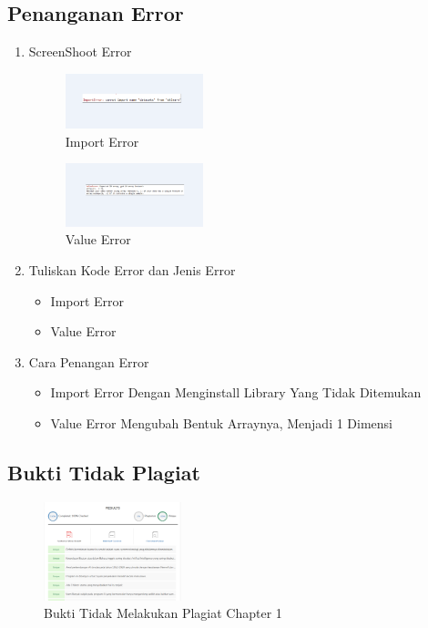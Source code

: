 \subsection{Penanganan Error}
\begin{enumerate}
	\item ScreenShoot Error
	\begin{figure}[H]
		\includegraphics[width=4cm]{figures/1174077/error/1_import.PNG}
		\centering
		\caption{Import Error}
	\end{figure}
	\begin{figure}[H]
		\includegraphics[width=4cm]{figures/1174077/error/1_value.PNG}
		\centering
		\caption{Value Error}
	\end{figure}
	\item Tuliskan Kode Error dan Jenis Error
	\begin{itemize}
		\item Import Error
		\item Value Error
	\end{itemize}
	\item Cara Penangan Error
	\begin{itemize}
		\item Import Error
		\hfill\break
		Dengan Menginstall Library Yang Tidak Ditemukan
		\item Value Error
		\hfill\break
		Mengubah Bentuk Arraynya, Menjadi 1 Dimensi
	\end{itemize}
\end{enumerate}
\subsection{Bukti Tidak Plagiat}
\begin{figure}[H]
	\includegraphics[width=4cm]{figures/1174077/bukti/1.PNG}
	\centering
	\caption{Bukti Tidak Melakukan Plagiat Chapter 1}
\end{figure}